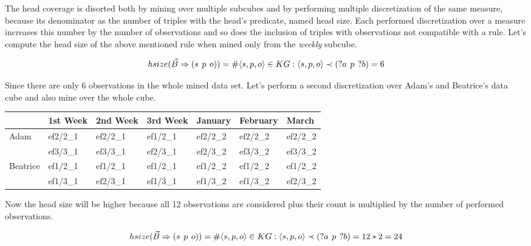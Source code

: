 The head coverage is disorted both by mining over multiple subcubes and by performing multiple discretization of the same measure, because its denominator as the number of triples with the head's predicate, named head size. Each performed discretization over a measure increases this number by the number of observations and so does the inclusion of triples with observations not compatible with a rule. Let's compute the head size of the above mentioned rule when mined only from the \textit{weekly} subcube.

$$
hsize(\vec{B} \Rightarrow (s\hspace{0.4em}p\hspace{0.4em}o)) = \# \langle s,p,o\rangle \in KG: \langle s,p,o\rangle \prec (?a\hspace{0.4em}p\hspace{0.4em}?b) = 6 
$$

Since there are only 6 observations in the whole mined data set. Let's perform a second discretization over Adam's and Beatrice's data cube and also mine over the whole cube. 

\begin{table}[h]
\centering
\begin{tabular}{l|llllll}
                          & 1st Week & 2nd Week & 3rd Week & January  & February & March     \\ 
\hline
\multirow{2}{*}{Adam}     & ef2/2\_1 & ef2/2\_1 & ef1/2\_1 & ef2/2\_2 & ef2/2\_2 & ef2/2\_2  \\
                          & ef3/3\_1 & ef3/3\_1 & ef2/3\_1 & ef2/3\_2 & ef3/3\_2 & ef3/3\_2  \\
\multirow{2}{*}{Beatrice} & ef1/2\_1 & ef1/2\_1 & ef1/2\_1 & ef1/2\_2 & ef1/2\_2 & ef1/2\_2  \\
                          & ef1/3\_1 & ef2/3\_1 & ef1/3\_1 & ef1/3\_2 & ef1/3\_2 & ef2/3\_2 
\end{tabular}
\end{table}

Now the head size will be higher because all 12 observations are considered plus their count is multiplied by the number of performed observations.

$$
hsize(\vec{B} \Rightarrow (s\hspace{0.4em}p\hspace{0.4em}o)) = \# \langle s,p,o\rangle \in KG: \langle s,p,o\rangle \prec (?a\hspace{0.4em}p\hspace{0.4em}?b) = 12 * 2 = 24
$$

